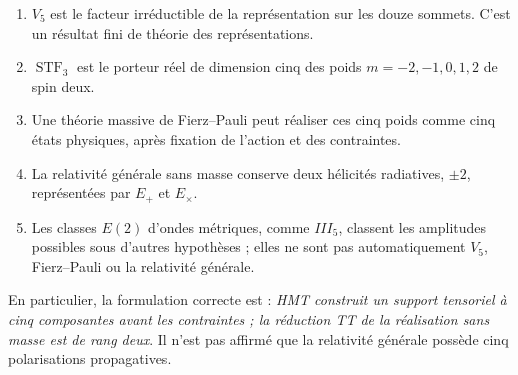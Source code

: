 \begin{enumerate}
\item \(V_5\) est le facteur irréductible de la représentation sur les
douze sommets. C’est un résultat fini de théorie des représentations.
\item \(\operatorname{STF}_3\) est le porteur réel de dimension cinq des
poids \(m=-2,-1,0,1,2\) de spin deux.
\item Une théorie massive de Fierz--Pauli peut réaliser ces cinq poids
comme cinq états physiques, après fixation de l’action et des contraintes.
\item La relativité générale sans masse conserve deux hélicités radiatives,
\(\pm2\), représentées par \(E_+\) et \(E_\times\).
\item Les classes \(E(2)\) d’ondes métriques, comme \(III_5\), classent
les amplitudes possibles sous d’autres hypothèses ; elles ne sont pas automatiquement
\(V_5\), Fierz--Pauli ou la relativité générale.
\end{enumerate}

En particulier, la formulation correcte est : \emph{HMT construit un support tensoriel à cinq composantes avant les contraintes ; la réduction TT de la réalisation sans masse est de rang deux}. Il n’est pas affirmé que la relativité générale possède cinq polarisations propagatives.

